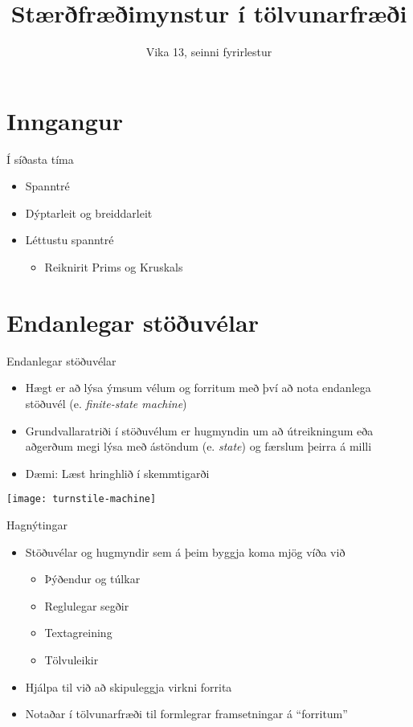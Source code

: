 \documentclass{beamer}
\title{Stærðfræðimynstur í tölvunarfræði}
\subtitle{Vika 13, seinni fyrirlestur}
\begin{document}
\begin{frame}
\titlepage
\end{frame}


\section{Inngangur}

\begin{frame}{Í síðasta tíma}
\begin{itemize}
 \item Spanntré
 \item Dýptarleit og breiddarleit
 \item Léttustu spanntré
 \begin{itemize}
  \item Reiknirit Prims og Kruskals
 \end{itemize}
\end{itemize}
\end{frame}

\section{Endanlegar stöðuvélar}

\begin{frame}{Endanlegar stöðuvélar}
\begin{itemize}
 \item Hægt er að lýsa ýmsum vélum og forritum með því að nota endanlega stöðuvél (e. \emph{finite-state machine})
 \item Grundvallaratriði í stöðuvélum er hugmyndin um að útreikningum eða aðgerðum megi lýsa með ástöndum (e. \emph{state}) og færslum þeirra á milli
 \item Dæmi: Læst hringhlið í skemmtigarði
\end{itemize}
\begin{center}
\texttt{[image: turnstile-machine]}
\end{center}
\end{frame}

\begin{frame}{Hagnýtingar}
\begin{itemize}
 \item Stöðuvélar og hugmyndir sem á þeim byggja koma mjög víða við
  \begin{itemize}
  \item Þýðendur og túlkar
  \item Reglulegar segðir
  \item Textagreining
  \item Tölvuleikir
 \end{itemize}
 \item Hjálpa til við að skipuleggja virkni forrita
 \item Notaðar í tölvunarfræði til formlegrar framsetningar á ``forritum''
\end{itemize}

\end{frame}
\end{document}
